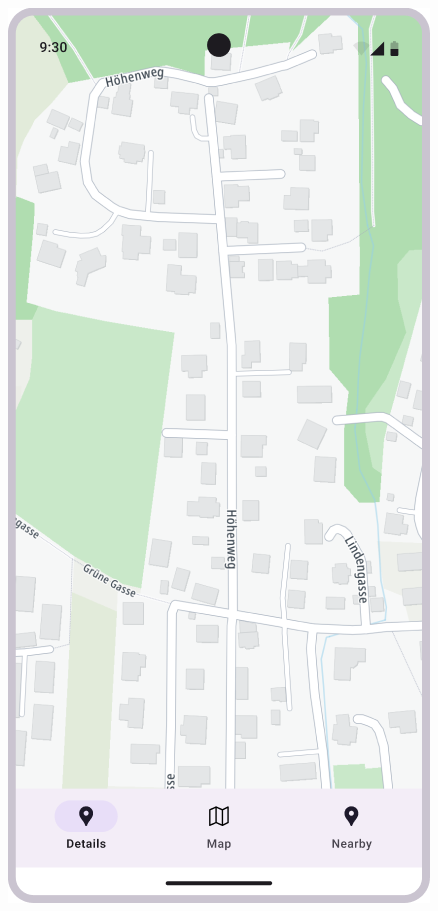 \begin{figure}[h]
    \centering
    \begin{minipage}{0.3\textwidth}
        \centering
        \includegraphics[width=\textwidth]{images/paul/wireframes/mapScreen.png}

\end{minipage}
\end{figure}
